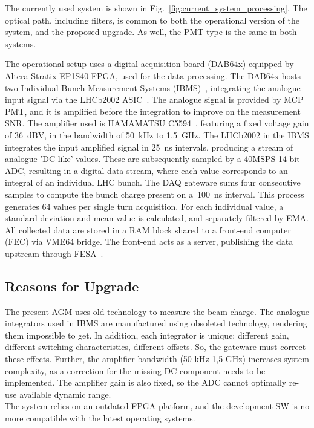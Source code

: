 The currently used system is shown in Fig.~\ref{fig:current_system_processing}.
%
The optical path, including filters, is common to both the operational version of the system, and the proposed upgrade. As well, the PMT type is the same in both systems.

The operational setup uses a digital acquisition board (DAB64x) equipped by Altera Stratix EP1S40 FPGA, used for the data processing.
%
The DAB64x hosts two Individual Bunch Measurement Systems (IBMS)~\cite{ibms}, integrating the analogue input signal via the LHCb2002 ASIC~\cite{lhcb_asic}.
%
The analogue signal is provided by MCP PMT, and it is amplified before the integration to improve on the measurement SNR.
%
The amplifier used is HAMAMATSU C5594~\cite{bsra_first_operation}, featuring a fixed voltage gain of \SI{36}{dBV}, in the bandwidth of \SI{50}{kHz} to \SI{1.5}{GHz}.
%
The LHCb2002 in the IBMS integrates the input amplified signal in \SI{25}{\nano\second} intervals, producing a stream of analogue 'DC-like' values.
%
These are subsequently sampled by a 40MSPS 14-bit ADC, resulting in a digital data stream, where each value corresponds to an integral of an individual LHC bunch.
%
The DAQ gateware sums four consecutive samples to compute the
bunch charge present on a~\SI{100}{ns} interval.
%
This process generates 64 values per single turn acquisition.
%
For each individual value, a standard deviation and mean value is calculated, and separately filtered by EMA. 
%
All collected data are stored in a RAM block shared to a front-end computer (FEC) via VME64 bridge.
%
The front-end acts as a server, publishing the data upstream through FESA~\cite{fesa}.

\subsection{Reasons for Upgrade}
The present AGM uses old technology to measure the beam charge. 
%
The analogue integrators used in IBMS are manufactured using obsoleted technology, rendering them impossible to get.
%
In addition, each integrator is unique: different gain, different switching characteristics, different offsets. 
%
So, the gateware must correct these effects.
%
Further, the amplifier bandwidth (50 kHz-1,5 GHz) increases system complexity, as a correction for the missing DC component needs to be implemented.
%
The amplifier gain is also fixed, so the ADC cannot optimally re-use available dynamic range.
\\
The system relies on an outdated FPGA platform, and the development SW is no more compatible with the latest operating systems. 

